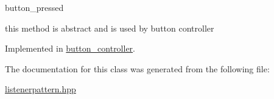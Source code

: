 button\+\_\+pressed 

this method is abstract and is used by button controller 

Implemented in \hyperlink{classbutton__controller_ac89e1b4894ecf3762958c97e2558d31b}{button\+\_\+controller}.



The documentation for this class was generated from the following file\+:\begin{DoxyCompactItemize}
\item 
\hyperlink{listenerpattern_8hpp}{listenerpattern.\+hpp}\end{DoxyCompactItemize}

